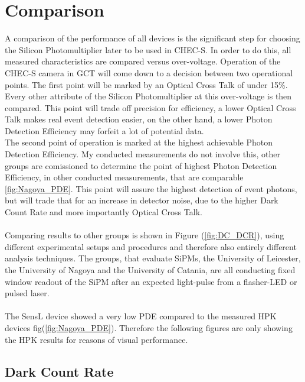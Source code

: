 \documentclass[12pt,article,type=msc,colorback,accentcolor=tud9c]{tudthesis}
\begin{document}
\section{\Large Comparison}
\label{sec:comparison}
A comparison of the performance of all devices is the significant step for choosing the Silicon Photomultiplier later to be used in CHEC-S. In order to do this, all measured characteristics are compared versus over-voltage. Operation of the CHEC-S camera in GCT will come down to a decision between two operational points. The first point will be marked by an Optical Cross Talk of under 15\%. Every other attribute of the Silicon Photomultiplier at this over-voltage is then compared. This point will trade off precision for efficiency, a lower Optical Cross Talk makes real event detection easier, on the other hand, a lower Photon Detection Efficiency may forfeit a lot of potential data.\\
The second point of operation is marked at the highest achievable Photon Detection Efficiency. My conducted measurements do not involve this, other groups are comissioned to determine the point of highest Photon Detection Efficiency, in other conducted measurements, that are comparable \ref{fig:Nagoya_PDE}. This point will assure the highest detection of event photons, but will trade that for an increase in detector noise, due to the higher Dark Count Rate and more importantly Optical Cross Talk.\\\\
Comparing results to other groups is shown in Figure (\ref{fig:DC_DCR}), using different experimental setups and procedures and therefore also entirely different analysis techniques. The groups, that evaluate SiPMs, the University of Leicester, the University of Nagoya and the University of Catania, are all conducting fixed window readout of the SiPM after an expected light-pulse from a flasher-LED or pulsed laser. \\\\
The SensL device showed a very low PDE compared to the measured HPK devices fig(\ref{fig:Nagoya_PDE}). Therefore the following figures are only showing the HPK results for reasons of visual performance.

\subsection{Dark Count Rate}
\label{subsec:DC_DCR}
\end{document}
